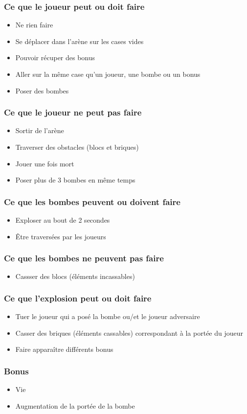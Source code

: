 \documentclass[a4paper,11pt,french]{article}
\begin{document}
\subsubsection{Ce que le joueur peut ou doit faire}
\begin{itemize}
\item Ne rien faire
\item Se déplacer dans l'arène sur les cases vides
\item Pouvoir récuper des bonus
\item Aller sur la même case qu'un joueur, une bombe ou un bonus
\item Poser des bombes
\end{itemize}
\subsubsection{Ce que le joueur ne peut pas faire}
\begin{itemize}
\item Sortir de l'arène
\item Traverser des obstacles (blocs et briques)
\item Jouer une fois mort
\item Poser plus de 3 bombes en même temps
\end{itemize}
\subsubsection{Ce que les bombes peuvent ou doivent faire}
\begin{itemize}
\item Exploser au bout de 2 secondes
\item Être traversées par les joueurs
\end{itemize}
\subsubsection{Ce que les bombes ne peuvent pas faire}
\begin{itemize}
\item Cassser des blocs (éléments incassables)
\end{itemize}
\subsubsection{Ce que l'explosion peut ou doit faire}
\begin{itemize}
\item Tuer le joueur qui a posé la bombe ou/et le joueur adversaire
\item Casser des briques (éléments cassables) correspondant à la portée du joueur
\item Faire apparaître différents bonus
\end{itemize}
\subsubsection{Bonus} 
\begin{itemize}
\item Vie
\item Augmentation de la portée de la bombe
\end{itemize}

\newpage 
\end{document}
